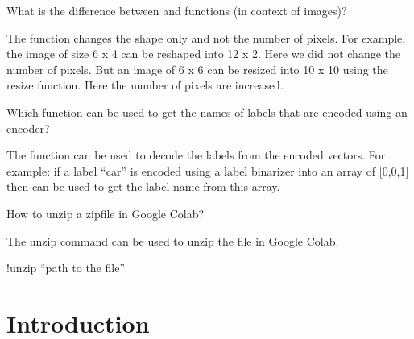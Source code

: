 	\begin{qanda}
		\begin{question}
What is the difference between  and  functions (in context of images)?
		\end{question}
		\begin{answer}
The  function changes the shape only and not the number of pixels.  For example, the image of size 6 x 4 can be reshaped into 12 x 2.  Here we did not change the number of pixels.  But an image of 6 x 6 can be resized into 10 x 10 using the resize function.  Here the number of pixels are increased.
		\end{answer}
	\end{qanda}

	\begin{qanda}
		\begin{question}
Which function can be used to get the names of labels that are encoded using an encoder?
		\end{question}
		\begin{answer}
The  function can be used to decode the labels from the encoded vectors.  For example: if a label ``car'' is encoded using a label binarizer into an array of [0,0,1] then  can be used to get the label name from this array.
		\end{answer}
	\end{qanda}

	\begin{qanda}
		\begin{question}
How to unzip a zipfile in Google Colab?
		\end{question}
		\begin{answer}
The unzip command can be used to unzip the file in Google Colab.
		\begin{code}[\codenumbering]{}
			\codeitemnonumber !unzip ``path to the file''
		\end{code}
		\end{answer}
	\end{qanda}

	\section{Introduction}

